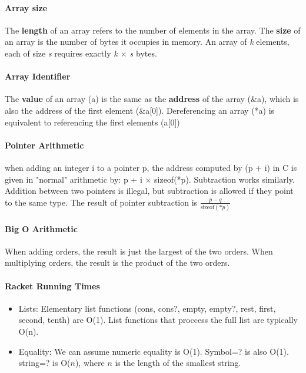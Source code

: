 \documentclass[10pt,letter]{article}
\begin{document}
\paragraph{Array size} The \textbf{length} of an array refers to the number of elements in the array. The \textbf{size} of an array is the number of bytes it occupies in memory. An array of \textit{k} elements, each of size \textit{s} requires exactly \textit{k $\times$ s} bytes.

\paragraph{Array Identifier} The \textbf{value} of an array (a) is the same as the \textbf{address} of the array (\&a), which is also the address of the first element (\&a[0]). Dereferencing an array (*a) is equivalent to referencing the first elements (a[0])

\paragraph{Pointer Arithmetic} when adding an integer i to a pointer p, the address computed by (p + i) in C is given in "normal" arithmetic by: p + i $\times$ sizeof(*p). Subtraction works similarly. Addition between two pointers is illegal, but subtraction is allowed if they point to the same type. The result of pointer subtraction is $\frac{p-q}{\text{sizeof}(*p)}$

\paragraph{Big O Arithmetic} When adding orders, the result is just the largest of the two orders. When multiplying orders, the result is the product of the two orders. 

\paragraph{Racket Running Times} \begin{itemize}
    \item Lists: Elementary list functions (cons, cons?, empty, empty?, rest, first, second, tenth) are O(1). List functions that proccess the full list are typically O(n).
    \item Equality: We can assume numeric equality is O(1). Symbol=? is also O(1). string=? is O($n$), where $n$ is the length of the smallest string.
\end{itemize}
\end{document}
